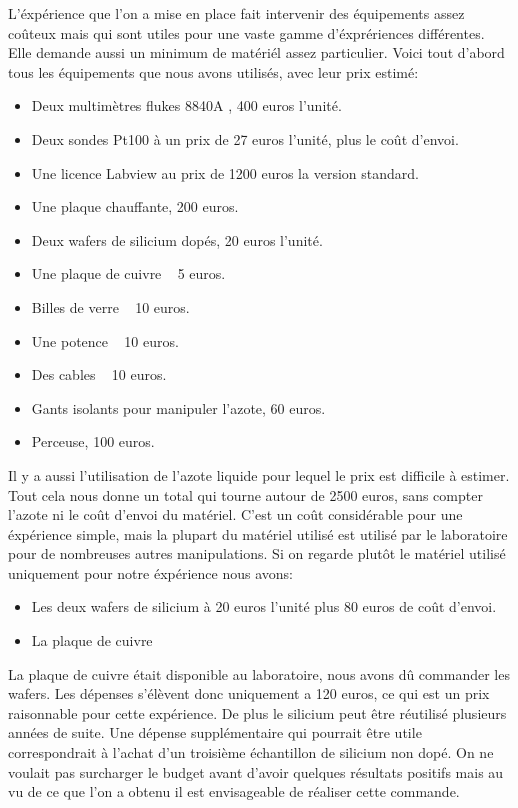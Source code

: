 L'éxpérience que l'on a mise en place fait intervenir des équipements assez coûteux mais qui sont utiles pour une vaste gamme d'éxprériences différentes. Elle demande aussi un minimum de matériél assez particulier. Voici tout d'abord tous les équipements que nous avons utilisés, avec leur prix estimé:
\begin{itemize}
  \item Deux multimètres flukes 8840A , 400 euros l'unité.
  \item Deux sondes Pt100 à un prix de 27 euros l'unité, plus le coût d'envoi.
  \item Une licence Labview au prix de 1200 euros la version standard.
  \item Une plaque chauffante, 200 euros.
  \item Deux wafers de silicium dopés, 20 euros l'unité.
  \item Une plaque de cuivre ~ 5 euros.
  \item Billes de verre ~ 10 euros.
  \item Une potence ~ 10 euros. 
  \item Des cables ~ 10 euros.
  \item Gants isolants pour manipuler l'azote, 60 euros.
  \item Perceuse, 100 euros.
\end{itemize}
Il y a aussi l'utilisation de l'azote liquide pour lequel le prix est difficile à estimer. 
Tout cela nous donne un total qui tourne autour de 2500 euros, sans compter l'azote ni le coût d'envoi du matériel.
C'est un coût considérable pour une éxpérience simple, mais la plupart du matériel utilisé est utilisé par le laboratoire pour de nombreuses autres manipulations. 
Si on regarde plutôt le matériel utilisé uniquement pour notre éxpérience nous avons:
\begin{itemize}
  \item Les deux wafers de silicium à 20 euros l'unité plus 80 euros de coût d'envoi.
  \item La plaque de cuivre
\end{itemize}
La plaque de cuivre était disponible au laboratoire, nous avons dû commander les wafers. Les dépenses s'élèvent donc uniquement a 120 euros, ce qui est un prix raisonnable pour cette expérience. De plus le silicium peut être réutilisé plusieurs années de suite. 
Une dépense supplémentaire qui pourrait être utile correspondrait à l'achat d'un troisième échantillon de silicium non dopé. On ne voulait pas surcharger le budget avant d'avoir quelques résultats positifs mais au vu de ce que l'on a obtenu il est envisageable de réaliser cette commande.
